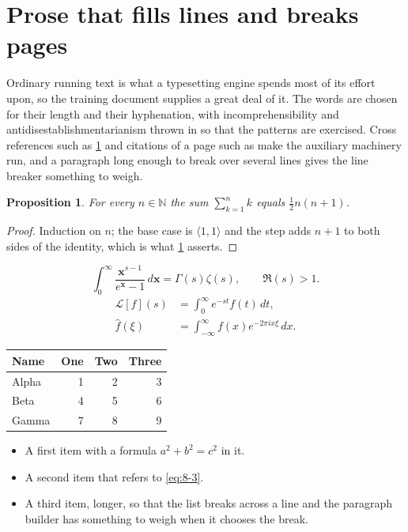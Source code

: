 \documentclass[11pt,a4paper]{report}
\theoremstyle{plain}
\newtheorem{proposition}{Proposition}[chapter]
\newcommand{\vecn}[1]{\mathbf{#1}}
\newcommand{\pairs}[2]{\langle #1,#2\rangle}
\begin{document}
\section{Prose that fills lines and breaks pages}
\label{sec:prose8-3}
Ordinary running text is what a typesetting engine spends most of its effort
upon, so the training document supplies a great deal of it. The words are
chosen for their length and their hyphenation, with incomprehensibility and
antidisestablishmentarianism thrown in so that the patterns are exercised.
Cross references such as \cref{sec:prose8-3} and citations of a page such
as \pageref{sec:prose8-3} make the auxiliary machinery run, and a
paragraph long enough to break over several lines gives the line breaker
something to weigh.
\begin{proposition}\label{prop:8-3}
For every $n\in\mathbb{N}$ the sum $\sum_{k=1}^{n}k$ equals
$\tfrac{1}{2}n(n+1)$.
\end{proposition}
\begin{proof}
Induction on $n$; the base case is $\pairs{1}{1}$ and the step adds $n+1$ to
both sides of the identity, which is what \cref{prop:8-3} asserts.
\end{proof}
\begin{equation}\label{eq:8-3}
  \int_{0}^{\infty}\frac{\vecn{x}^{s-1}}{e^{\vecn{x}}-1}\,d\vecn{x}
    = \Gamma(s)\zeta(s),\qquad \Re(s)>1 .
\end{equation}
\begin{align}
  \mathcal{L}[f](s) &= \int_{0}^{\infty} e^{-st} f(t)\,dt, \\
  \widehat{f}(\xi)  &= \int_{-\infty}^{\infty} f(x) e^{-2\pi i x\xi}\,dx .
\end{align}
\par\noindent\begin{center}
\begin{tabular}{lrrr}
\hline
Name & One & Two & Three \\
\hline
Alpha & 1 & 2 & 3 \\
Beta & 4 & 5 & 6 \\
Gamma & 7 & 8 & 9 \\
\hline
\end{tabular}
\end{center}
\begin{itemize}
  \item A first item with a formula $a^2+b^2=c^2$ in it.
  \item A second item that refers to \eqref{eq:8-3}.
  \item A third item, longer, so that the list breaks across a line and the
    paragraph builder has something to weigh when it chooses the break.
\end{itemize}
\end{document}

